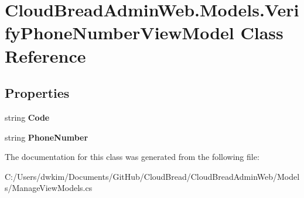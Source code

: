 \hypertarget{a00193}{}\section{Cloud\+Bread\+Admin\+Web.\+Models.\+Verify\+Phone\+Number\+View\+Model Class Reference}
\label{a00193}
\subsection*{Properties}
\begin{DoxyCompactItemize}
\item 
string {\bfseries Code}\hypertarget{a00193_a7d5925e0160fcf20876add7aae3f4463}{}\label{a00193_a7d5925e0160fcf20876add7aae3f4463}

\item 
string {\bfseries Phone\+Number}\hypertarget{a00193_ad318616ee462e2b328a3ebaf2a56a9ff}{}\label{a00193_ad318616ee462e2b328a3ebaf2a56a9ff}

\end{DoxyCompactItemize}


The documentation for this class was generated from the following file\+:\begin{DoxyCompactItemize}
\item 
C\+:/\+Users/dwkim/\+Documents/\+Git\+Hub/\+Cloud\+Bread/\+Cloud\+Bread\+Admin\+Web/\+Models/Manage\+View\+Models.\+cs\end{DoxyCompactItemize}
